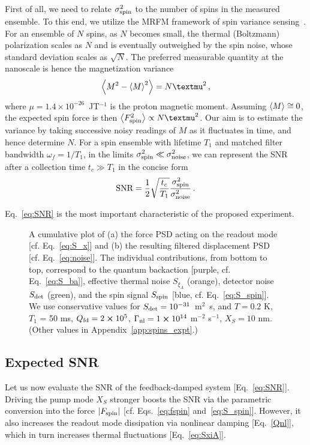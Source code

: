 First of all, we need to relate $\sigma_{\rm spin}^2$ to the number of spins in the measured ensemble. To this end, we utilize the MRFM framework of spin variance sensing~\cite{Degen_2007}. For an ensemble of $N$ spins, as $N$ becomes small, the thermal (Boltzmann) polarization scales as $N$ and is eventually outweighed by the spin noise, whose standard deviation scales as $\sqrt{N}$. The preferred measurable quantity at the nanoscale is hence the magnetization variance
\begin{equation}
\expval{M^2 - \expval{M}^2} = N \mu^2 \,,
\end{equation}
where $\mu = 1.4 \times 10^{-26}$~J\;T$^{-1}$ is the proton magnetic moment. Assuming $\expval{M} \cong 0$, the expected spin force is then $\expval{F^2_{\rm spin}} \propto N \mu^2$. Our aim is to estimate the variance by taking successive noisy readings of $M$ as it fluctuates in time, and hence determine $N$. For a spin ensemble with lifetime $T_1$ and matched filter bandwidth $\omega_f = 1 / T_1$, in the limits $\sigma_{\rm spin}^2 \ll \sigma_{\rm noise}^2$, we can represent the  SNR after a collection time $t_c \gg T_1$ in the concise form~\cite{Degen_2007}
\begin{equation} \label{eq:SNR}
\text{SNR} = \frac{1}{2} \sqrt{\frac{t_c}{T_1}}\frac{\sigma_{\rm spin}^2}{\sigma_{\rm noise}^2} \,.
\end{equation}

Eq.~\eqref{eq:SNR} is the most important characteristic of the proposed experiment.


\begin{figure}
	\centering
	\hspace{-6mm}
	
	\caption{A cumulative plot of (a) the force PSD acting on the readout mode [cf. Eq.~\eqref{eq:S_x}] and (b) the resulting filtered displacement PSD [cf. Eq.~\eqref{eq:noise}]. The individual contributions, from bottom to top, correspond to the quantum backaction [purple, cf. Eq.~\eqref{eq:S_ba}], effective thermal noise $S_{\xi_A}$ (orange), detector noise $S_{\rm det}$ (green), and the spin signal $S_{\rm spin}$ [blue, cf. Eq.~\eqref{eq:S_spin}]. We use conservative values for $S_{\rm det} = 10^{-31}$~m$^2$~s, and $T = 0.2$ K, $T_1$ = 50 ms, $Q_{\rm fd} =2 \cross 10^5$, $\Gamma_{\rm nl} = 1 \cross 10^{14}$ m$^{-2}$ s$^{-1}$, $X_S = 10$ nm. (Other values in Appendix~\ref{app:spins_expt}.)}
	\label{fig:PSDs}
\end{figure}

\subsection{Expected SNR}
Let us now evaluate the SNR of the feedback-damped system [Eq.~\eqref{eq:SNR}]. Driving the pump mode $X_S$ stronger boosts the SNR via the parametric conversion into the force $\abs{F_{\rm spin}}$ [cf. Eqs.~\eqref{eq:fspin} and~\eqref{eq:S_spin}]. However, it also increases the readout mode dissipation via nonlinear damping [Eq.~\eqref{Qnl}], which in turn increases thermal fluctuations [Eq.~\eqref{eq:SxiA}]. 


